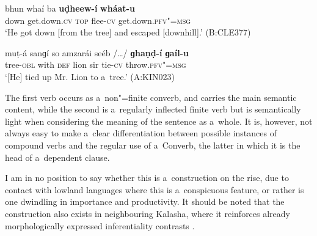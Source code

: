 \begin{exe}
\ex
\label{ex:8-26}
\gll bhun whaí ba \textbf{uḍheew-í} \textbf{wháat-u} \\
down get.down.\textsc{cv} \textsc{top} flee-\textsc{cv} get.down.\textsc{pfv"=msg} \\
\glt `He got down [from the tree] and escaped [downhill].' (B:CLE377)
\end{exe}
\begin{exe}
\ex
\label{ex:8-27}
\gll muṭ-á sanɡí so amzarái seéb /{\ldots}/ \textbf{ɡhaṇḍ-í} \textbf{ɡaíl-u} \\
tree-\textsc{obl} with \textsc{def} lion sir {} tie-\textsc{cv} throw.\textsc{pfv"=msg} \\
\glt `[He] tied up Mr. Lion to a~tree.' (A:KIN023)
\end{exe}

The first verb occurs as a~non"=finite converb, and carries the main semantic content, while the second is a~regularly inflected finite verb but is semantically light when considering the meaning of the sentence as a~whole. It is, however, not always easy to make a~clear differentiation between possible instances of compound verbs and the regular use of a~Converb, the latter in which it is the head of a~dependent clause. 



I am in no position to say whether this is a~construction on the rise, due to contact with lowland languages where this is a~conspicuous feature, or rather is one dwindling in importance and productivity. It should be noted that the construction also exists in neighbouring Kalasha, where it reinforces already morphologically expressed inferentiality contrasts \citep[1--4]{bashir1993}.